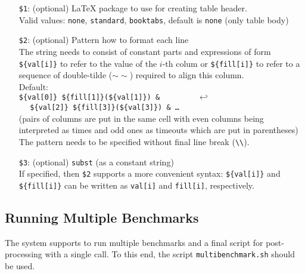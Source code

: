 \documentclass[a4paper]{article}
\begin{document}
			\medskip{}
			\begin{itemize}
				\item[{\tt \$1}:] (optional) \LaTeX{} package to use for creating table header. \\
					Valid values: {\tt none}, {\tt standard}, {\tt booktabs}, default is {\tt none} (only table body)
				\item[{\tt \$2}:] (optional) Pattern how to format each line \\
					The string needs to consist of constant parts and expressions of form
					{\tt \$\{val[i]\}} to refer to the value of the $i$-th colum
					or {\tt \$\{fill[i]\}} to refer to a sequence of double-tilde ($\sim\sim$) required to align this column. \\
					Default: \\
					{\tt \$\{val[0]\} \$\{fill[1]\}(\$\{val[1]\}) \& $~~~~~~~~~~~~~~~~~~\hookleftarrow$ \\
					$~~~~~~$\$\{val[2]\} \$\{fill[3]\}(\$\{val[3]\}) \& \ldots} \\
					(pairs of columns are put in the same cell with even columns being interpreted as times
					and odd ones as timeouts which are put in parentheses) \\
					The pattern needs to be specified without final line break ({\tt \textbackslash\textbackslash}).
				\item[{\tt \$3}:] (optional) {\tt subst} (as a constant string) \\
					If specified, then {\tt \$2} supports a more convenient syntax: {\tt \$\{val[i]\}} and {\tt \$\{fill[i]\}} can be written as {\tt val[i]} and {\tt fill[i]}, respectively.
			\end{itemize}

		\subsection{Running Multiple Benchmarks}
		\label{sec:advanced:multiple}
					
			The system supports to run multiple benchmarks and a final script for post-processing with a single call.
			To this end, the script {\tt multibenchmark.sh} should be used.
\end{document}
